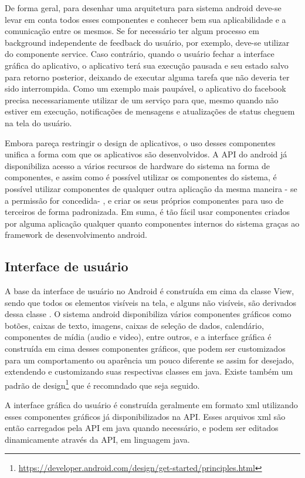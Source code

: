De forma geral, para desenhar uma arquitetura para sistema android deve-se levar em conta todos esses componentes e conhecer bem sua aplicabilidade e a comunicação entre os mesmos. Se for necessário ter algum processo em background independente de feedback do usuário, por exemplo, deve-se utilizar do componente service. Caso contrário, quando o usuário fechar a interface gráfica do aplicativo, o aplicativo terá sua execução pausada e seu estado salvo para retorno posterior, deixando de executar alguma tarefa que não deveria ter sido interrompida. Como um exemplo mais paupável, o aplicativo do facebook precisa necessariamente utilizar de um serviço para que, mesmo quando não estiver em execução, notificações de mensagens e atualizações de status cheguem na tela do usuário.

Embora pareça restringir o design de aplicativos, o uso desses componentes unifica a forma com que os aplicativos são desenvolvidos. A API do android já disponibiliza acesso a vários recursos de hardware do sistema na forma de componentes, e assim como é possível utilizar os componentes do sistema, é possível utilizar componentes de qualquer outra aplicação da mesma maneira - se a permissão for concedida- , e criar os seus próprios componentes para uso de terceiros de forma padronizada. Em suma, é tão fácil usar componentes criados por alguma aplicação qualquer quanto componentes internos do sistema graças ao framework de desenvolvimento android.

\subsection{Interface de usuário}

A base da interface de usuário no Android é construída em cima da classe View, sendo que todos os elementos visíveis na tela, e alguns não visíveis, são derivados dessa classe \cite{androidarch2010}. O sistema android disponibiliza vários componentes gráficos como botões, caixas de texto, imagens, caixas de seleção de dados, calendário, componentes de mídia (audio e video), entre outros, e a interface gráfica é construída em cima desses componentes gráficos, que podem ser customizados para um comportamento ou aparência um pouco diferente se assim for desejado, extendendo e customizando suas respectivas classes em java. Existe também um padrão de design\footnote{\url{https://developer.android.com/design/get-started/principles.html}} que é recomndado que seja seguido.

A interface gráfica do usuário é construída geralmente em formato xml utilizando esses componentes gráficos já disponibilizados na API. Esses arquivos xml são então carregados pela API em java quando necessário, e podem ser editados dinamicamente através da API, em linguagem java.

